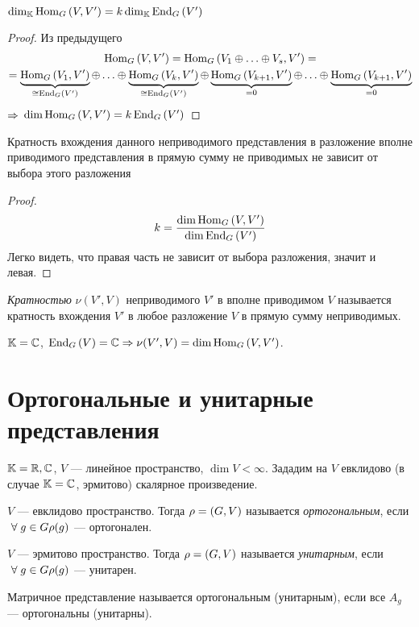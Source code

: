\begin{stm}
	$
		\dim_{\mathbb{K}}\operatorname{Hom}_G\left(V, V'\right) = k \dim_{\mathbb{K}}\operatorname{End}_G\left(V'\right)
	$
\end{stm}
\begin{proof}
	Из предыдущего
	\begin{gather*}
		\Hom_G\hr{V, V'} = \Hom_G\hr{V_1 \sop V_s, V'} = \\
		= \ub{\Hom_G\hr{V_1, V'}}_{\cong\End_G\hr{V'}} \sop \ub{\Hom_G\hr{V_k, V'}}_{\cong\End_G\hr{V'}} \oplus
		\ub{\Hom_G\hr{V_{k + 1}, V'}}_{=0} \sop \ub{\Hom_G\hr{V_{k + 1}, V'}}_{=0}
	\end{gather*}
	$\Rightarrow$ $\dim \operatorname{Hom}_G \left(V, V'\right) = k \operatorname{End}_G\left(V'\right)$
\end{proof}
\begin{theorem}
	Кратность вхождения данного неприводимого представления
	в разложение вполне приводимого представления в прямую
	сумму не приводимых не зависит от выбора этого разложения
\end{theorem}
\begin{proof}
	\begin{equation} \label{MofS}
		k = \frac{\dim\operatorname{Hom}_G\left(V, V'\right)}{\dim\operatorname{End}_G\left(V'\right)}
	\end{equation}
	Легко видеть, что правая часть не зависит от выбора разложения, значит и левая.
\end{proof}
\begin{df}
	\textit{Кратностью} $\nu(V', V)$ неприводимого $V'$
	в вполне приводимом $V$ называется
	кратность вхождения $V'$ в любое разложение $V$ в прямую сумму неприводимых.
\end{df}
\begin{imp}
	$\mathbb{K} = \mathbb{C}$, $\operatorname{End}_G\left(V\right) = \mathbb{C} \Rightarrow \nu(V', V) = \dim\operatorname{Hom}_G\left(V, V'\right)$.
\end{imp}


\section{Ортогональные и унитарные представления}
$\mathbb{K} = \mathbb{R}, \mathbb{C}$, $V$ --- линейное пространство, $\dim V < \infty$.
Зададим на $V$ евклидово (в случае $\mathbb{K} = \mathbb{C}$, эрмитово) скалярное произведение.
\begin{df}
	$V$ --- евклидово пространство.
	Тогда $\rho = \left(G, V\right)$ называется \textit{ортогональным}, если
	$~\forall\; g \in G \rho(g)$ --- ортогонален.

	$V$ --- эрмитово пространство.
	Тогда $\rho = \left(G, V\right)$ называется \textit{унитарным}, если
	$~\forall\; g \in G \rho(g)$ --- унитарен.

	Матричное представление называется ортогональным (унитарным),
	если все $A_g$ --- ортогональны (унитарны).
\end{df}

